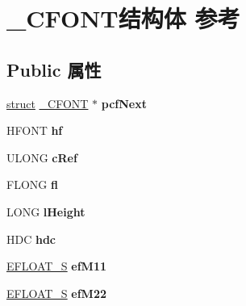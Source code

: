 \hypertarget{struct___c_f_o_n_t}{}\section{\+\_\+\+C\+F\+O\+N\+T结构体 参考}
\label{struct___c_f_o_n_t}
\subsection*{Public 属性}
\begin{DoxyCompactItemize}
\item 
\mbox{\label{struct___c_f_o_n_t_a9d97bc3c9857b69e94dd3a8d0d536e25}} 
\hyperlink{interfacestruct}{struct} \hyperlink{struct___c_f_o_n_t}{\+\_\+\+C\+F\+O\+NT} $\ast$ {\bfseries pcf\+Next}
\item 
\mbox{\label{struct___c_f_o_n_t_a94e922575f4b5ec111337bf17cde0d05}} 
H\+F\+O\+NT {\bfseries hf}
\item 
\mbox{\label{struct___c_f_o_n_t_a1f5a4c95d9b477bb307fd9e5208a7195}} 
U\+L\+O\+NG {\bfseries c\+Ref}
\item 
\mbox{\label{struct___c_f_o_n_t_a21565b2df9630574924a6144c34c5aed}} 
F\+L\+O\+NG {\bfseries fl}
\item 
\mbox{\label{struct___c_f_o_n_t_a8d1277ae0e9e6cad0f1cf1a526014c8c}} 
L\+O\+NG {\bfseries l\+Height}
\item 
\mbox{\label{struct___c_f_o_n_t_a326f46cb21181a485d038beae7aa83fc}} 
H\+DC {\bfseries hdc}
\item 
\mbox{\label{struct___c_f_o_n_t_a0463f3a6be34ed39add0c48c64234ca7}} 
\hyperlink{struct___e_f_l_o_a_t___s}{E\+F\+L\+O\+A\+T\+\_\+S} {\bfseries ef\+M11}
\item 
\mbox{\label{struct___c_f_o_n_t_a1f53cd44297566153600c8096bced1a2}} 
\hyperlink{struct___e_f_l_o_a_t___s}{E\+F\+L\+O\+A\+T\+\_\+S} {\bfseries ef\+M22}
\item 
\mbox{\label{struct___c_f_o_n_t_a18cbee04321342fa2f0a6dd0fbec194e}} 

\end{DoxyCompactItemize}
